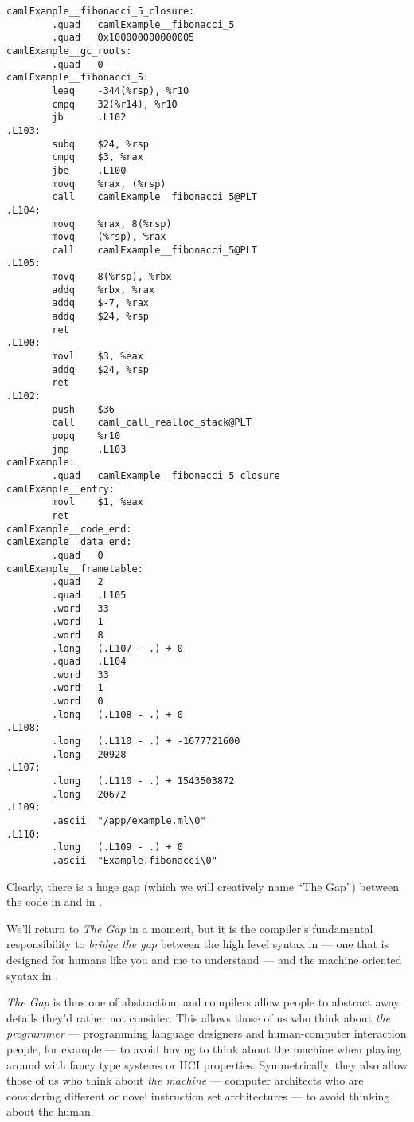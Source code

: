 \begin{code}
\label{code:fib-assembly}
\begin{verbatim}
camlExample__fibonacci_5_closure:
        .quad   camlExample__fibonacci_5
        .quad   0x100000000000005
camlExample__gc_roots:
        .quad   0
camlExample__fibonacci_5:
        leaq    -344(%rsp), %r10
        cmpq    32(%r14), %r10
        jb      .L102
.L103:
        subq    $24, %rsp
        cmpq    $3, %rax
        jbe     .L100
        movq    %rax, (%rsp)
        call    camlExample__fibonacci_5@PLT
.L104:
        movq    %rax, 8(%rsp)
        movq    (%rsp), %rax
        call    camlExample__fibonacci_5@PLT
.L105:
        movq    8(%rsp), %rbx
        addq    %rbx, %rax
        addq    $-7, %rax
        addq    $24, %rsp
        ret
.L100:
        movl    $3, %eax
        addq    $24, %rsp
        ret
.L102:
        push    $36
        call    caml_call_realloc_stack@PLT
        popq    %r10
        jmp     .L103
camlExample:
        .quad   camlExample__fibonacci_5_closure
camlExample__entry:
        movl    $1, %eax
        ret
camlExample__code_end:
camlExample__data_end:
        .quad   0
camlExample__frametable:
        .quad   2
        .quad   .L105
        .word   33
        .word   1
        .word   8
        .long   (.L107 - .) + 0
        .quad   .L104
        .word   33
        .word   1
        .word   0
        .long   (.L108 - .) + 0
.L108:
        .long   (.L110 - .) + -1677721600
        .long   20928
.L107:
        .long   (.L110 - .) + 1543503872
        .long   20672
.L109:
        .ascii  "/app/example.ml\0"
.L110:
        .long   (.L109 - .) + 0
        .ascii  "Example.fibonacci\0"
\end{verbatim}
\end{code}

Clearly, there is a huge gap (which we will creatively name ``The Gap'') between the code in  and in .

We'll return to \emph{The Gap} in a moment, but it is the compiler's fundamental responsibility to \emph{bridge the gap} between the high level syntax in  --- one that is designed for humans like you and me to understand --- and the machine oriented syntax in . 

\emph{The Gap} is thus one of abstraction, and compilers allow people to abstract away details they'd rather not consider. This allows those of us who think about \emph{the programmer} --- programming language designers and human-computer interaction people, for example --- to avoid having to think about the machine when playing around with fancy type systems or HCI properties. Symmetrically, they also allow those of us who think about \emph{the machine} --- computer architects who are considering different or novel instruction set architectures --- to avoid thinking about the human. 

